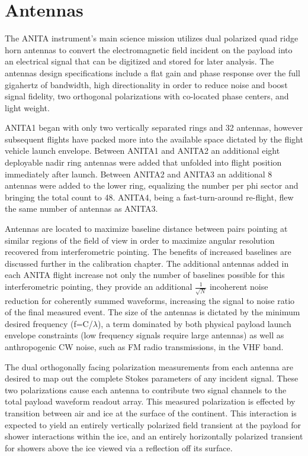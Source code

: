 	
\section{Antennas}
	The ANITA instrument's main science mission utilizes dual polarized quad ridge horn antennas to convert the electromagnetic field incident on the payload into an electrical signal that can be digitized and stored for later analysis.  The antennas design specifications include a flat gain and phase response over the full gigahertz of bandwidth, high directionality in order to reduce noise and boost signal fidelity, two orthogonal polarizations with co-located phase centers, and light weight.
	
	ANITA1 began with only two vertically separated rings and 32 antennas, however subsequent flights have packed more into the available space dictated by the flight vehicle launch envelope.  Between ANITA1 and ANITA2 an additional eight deployable nadir ring antennas were added that unfolded into flight position immediately after launch.  Between ANITA2 and ANITA3 an additional 8 antennas were added to the lower ring, equalizing the number per phi sector and bringing the total count to 48.  ANITA4, being a fast-turn-around re-flight, flew the same number of antennas as ANITA3.
	
	Antennas are located to maximize baseline distance between pairs pointing at similar regions of the field of view in order to maximize angular resolution recovered from interferometric pointing.  The benefits of increased baselines are discussed further in the calibration chapter.  The additional antennas added in each ANITA flight increase not only the number of baselines possible for this interferometric pointing, they provide an additional $\frac{1}{\sqrt{N}}$ incoherent noise reduction for coherently summed waveforms, increasing the signal to noise ratio of the final measured event.  The size of the antennas is dictated by the minimum desired frequency (f=C/$\lambda$), a term dominated by both physical payload launch envelope constraints (low frequency signals require large antennas) as well as anthropogenic CW noise, such as FM radio transmissions, in the VHF band.  
	
	The dual orthogonally facing polarization measurements from each antenna are desired to map out the complete Stokes parameters of any incident signal.  These two polarizations cause each antenna to contribute two signal channels to the total payload waveform readout array.  This measured polarization is effected by transition between air and ice at the surface of the continent.  This interaction is expected to yield an entirely vertically polarized field transient at the payload for shower interactions within the ice, and an entirely horizontally polarized transient for showers above the ice viewed via a reflection off its surface.  
	
